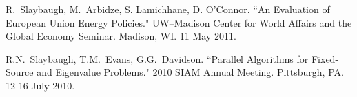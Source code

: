 \begin{bibsection}

\item R.\ Slaybaugh, M.\ Arbidze, S. Lamichhane, D. O'Connor. ``An Evaluation of European Union Energy Policies." UW--Madison Center for World Affairs and the Global Economy Seminar. Madison, WI. 11 May 2011.


\item R.N.\ Slaybaugh, T.M.\ Evans, G.G.\ Davidson. ``Parallel Algorithms for Fixed-Source and Eigenvalue Problems." 2010 SIAM Annual Meeting. Pittsburgh, PA. 12-16 July 2010.



\end{bibsection}


